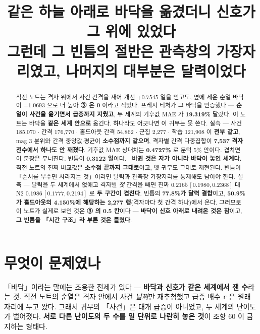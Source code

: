 \documentclass{article}
\title{같은 하늘 아래로 바닥을 옮겼더니 신호가 그 위에 있었다 \\
  {\large 그런데 그 빈틈의 절반은 관측창의 가장자리였고, 나머지의 대부분은 달력이었다}}
\begin{document}
\maketitle

\begin{abstract}
직전 노트는 격자 위에서 사건 간격을 재어 개선 $+0.7545$ 일을 얻고도,
옆에 세운 순열 바닥이 $+1.0693$ 으로 더 높아 \textbf{③ 은 0} 이라고 적었다.
프레시 티처가 그 바닥을 반증했다 --- \textbf{순열이 사건을 옮기면서 급증까지 지웠고},
두 세계의 기후값 MAE 가 \textbf{19.319\%} 달랐다.
이 노트는 바닥을 \textbf{같은 세계 안으로} 옮긴다.
{하나라도 어긋나면 이 귀무는 못 쓴다. 실측 --- 사건 185{,}070 $\cdot$ 간격 176{,}770 $\cdot$
홀드아웃 간격 54{,}862 $\cdot$ 군집 2{,}277 $\cdot$ 학습 121{,}908 이 \textbf{전부 같고},
mag 3 분위와 간격 중앙값$\cdot$평균이 \textbf{소수점까지 같으며},
격자별 간격 다중집합이 \textbf{7{,}537 격자 전수에서 하나도 안 깨졌다}.
기후값 MAE 상대차는 \textbf{0.4727\%} 로 문턱 5\% 안이다.}
{겹치면 이 문장은 무너진다. 빈틈이 \textbf{0.3122 일}이다.}
🔴 \textbf{바뀐 것은 자가 아니라 바닥이 놓인 세계다.}
직전 노트의 진짜 비교값은 \textbf{소수점 끝까지 그대로}이고, 옛 귀무도 그대로 재현된다.
{빈틈이 「순서를 부수면 사라지는 것」이라면 달력과 관측창 가장자리를 통제해도 남아야 한다.
실측 --- 달력을 두 세계에서 없애고 격자별 \emph{첫} 간격을 빼면
진짜 $0.2165\,[0.1980, 0.2368]$ 대 N2 $0.1986\,[0.1777, 0.2194]$ 로 \textbf{두 구간이 겹친다}.
빈틈의 \textbf{77.8\%가 달력 결합}이고, \textbf{50.9\%가 홀드아웃의 4.150\%에 해당하는
2{,}277 행}(격자마다 첫 간격 하나)에서 온다.}
그러므로 이 노트가 실제로 보인 것은 \textbf{③ 의 0.5 칸}이다 ---
\textbf{바닥이 신호 아래로 내려온 것은 참}이고, \textbf{그 빈틈을 「시간 구조」라 부른 것은 틀렸다}.
\end{abstract}

\section{무엇이 문제였나}

「바닥」이라는 말에는 조용한 전제가 있다 --- \textbf{바닥과 신호가 같은 세계에서 잰 수}라는 것.
직전 노트의 순열은 격자 안에서 사건 \emph{날짜}만 재추첨했고 급증 배수 \texttt{r} 은 원래 자리에 두고 왔다.
그래서 귀무의 「사건」은 대개 급증이 아니었고, 두 세계의 난이도가 벌어졌다.
\textbf{서로 다른 난이도의 두 수를 일 단위로 나란히 놓은 것}이 조항 60 이 금지하는 형태다.
\end{document}
